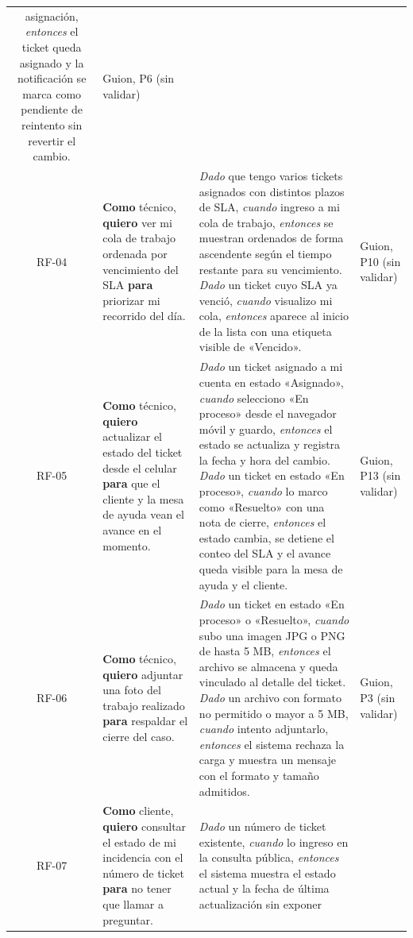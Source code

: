 \begin{longtable}{@{}c p{4.2cm} p{5.3cm} p{3.3cm}@{}}
asignación, \emph{entonces} el ticket queda asignado y la notificación se marca como pendiente de
reintento sin revertir el cambio.
& Guion, P6 (sin validar) \\
\addlinespace
RF-04 & \textbf{Como} técnico, \textbf{quiero} ver mi cola de trabajo ordenada por vencimiento del
SLA \textbf{para} priorizar mi recorrido del día.
& \emph{Dado} que tengo varios tickets asignados con distintos plazos de SLA, \emph{cuando} ingreso
a mi cola de trabajo, \emph{entonces} se muestran ordenados de forma ascendente según el tiempo
restante para su vencimiento.
\newline \emph{Dado} un ticket cuyo SLA ya venció, \emph{cuando} visualizo mi cola, \emph{entonces}
aparece al inicio de la lista con una etiqueta visible de «Vencido».
& Guion, P10 (sin validar) \\
\addlinespace
RF-05 & \textbf{Como} técnico, \textbf{quiero} actualizar el estado del ticket desde el celular
\textbf{para} que el cliente y la mesa de ayuda vean el avance en el momento.
& \emph{Dado} un ticket asignado a mi cuenta en estado «Asignado», \emph{cuando} selecciono «En
proceso» desde el navegador móvil y guardo, \emph{entonces} el estado se actualiza y registra la
fecha y hora del cambio.
\newline \emph{Dado} un ticket en estado «En proceso», \emph{cuando} lo marco como «Resuelto» con
una nota de cierre, \emph{entonces} el estado cambia, se detiene el conteo del SLA y el avance queda
visible para la mesa de ayuda y el cliente.
& Guion, P13 (sin validar) \\
\addlinespace
RF-06 & \textbf{Como} técnico, \textbf{quiero} adjuntar una foto del trabajo realizado
\textbf{para} respaldar el cierre del caso.
& \emph{Dado} un ticket en estado «En proceso» o «Resuelto», \emph{cuando} subo una imagen JPG o PNG
de hasta 5 MB, \emph{entonces} el archivo se almacena y queda vinculado al detalle del ticket.
\newline \emph{Dado} un archivo con formato no permitido o mayor a 5 MB, \emph{cuando} intento
adjuntarlo, \emph{entonces} el sistema rechaza la carga y muestra un mensaje con el formato y tamaño
admitidos.
& Guion, P3 (sin validar) \\
\addlinespace
RF-07 & \textbf{Como} cliente, \textbf{quiero} consultar el estado de mi incidencia con el número
de ticket \textbf{para} no tener que llamar a preguntar.
& \emph{Dado} un número de ticket existente, \emph{cuando} lo ingreso en la consulta pública,
\emph{entonces} el sistema muestra el estado actual y la fecha de última actualización sin exponer

\end{longtable}
